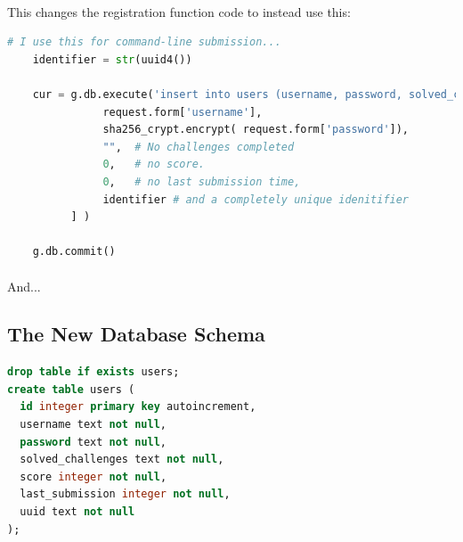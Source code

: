 \documentclass[11pt]{article}
\begin{document}
	\paragraph{} This changes the registration function code to instead use this:


	\begin{lstlisting}[language=Python]
	# I use this for command-line submission...
	identifier = str(uuid4())

	cur = g.db.execute('insert into users (username, password, solved_challenges, score, last_submission, uuid) values ( ?, ?, ?, ?, ?, ? )', [ 
               request.form['username'], 
               sha256_crypt.encrypt( request.form['password']),
               "",  # No challenges completed
               0,   # no score.
               0,   # no last submission time,
               identifier # and a completely unique idenitifier
		  ] )

	g.db.commit()
	\end{lstlisting}

	\paragraph{} And...

	\subsection{The New Database Schema}

	\begin{lstlisting}[language=SQL]
drop table if exists users;
create table users (
  id integer primary key autoincrement,
  username text not null,
  password text not null,
  solved_challenges text not null,
  score integer not null,
  last_submission integer not null,
  uuid text not null
);
	\end{lstlisting}

	\paragraph{}

	\begin{center}
		\graphicspath{ {.} }
		\centering
	\end{center}
\end{document}
